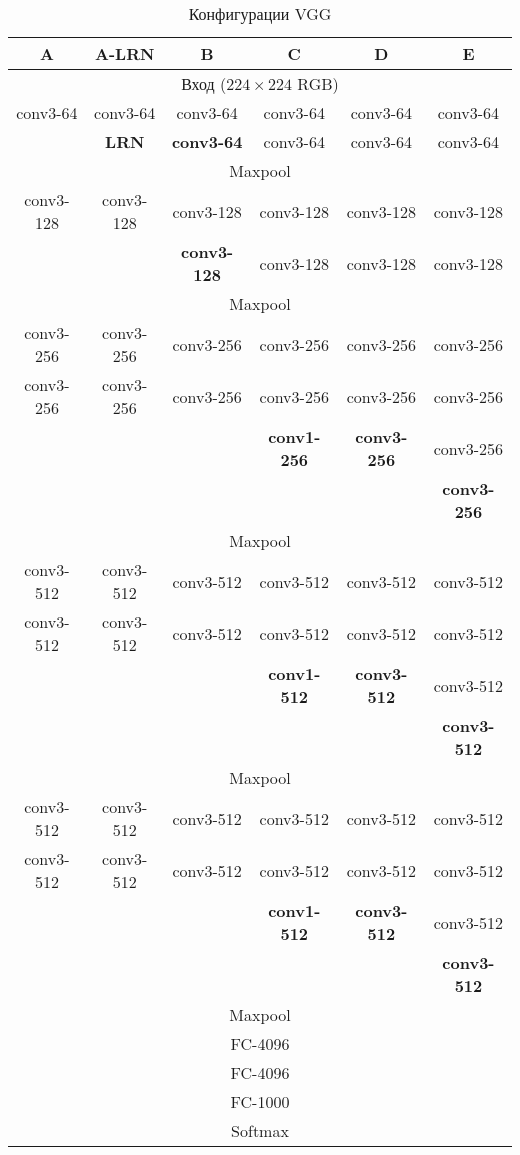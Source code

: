\begin{table}[H]
    \centering
    \caption{Конфигурации VGG} \label{vgg}
    \begin{tabular}{|c|c|c|c|c|c|} \hline
    A & A-LRN & B & C & D & E \\ \hline
    \multicolumn{6}{|c|}{Вход ($224 \times 224$ RGB)} \\ \hline
    conv3-64 & conv3-64 & conv3-64 & conv3-64 & conv3-64 & conv3-64 \\ 
     & \textbf{LRN} & \textbf{conv3-64} & conv3-64 & conv3-64 & conv3-64\\ \hline
    \multicolumn{6}{|c|}{Maxpool} \\ \hline
    conv3-128 & conv3-128 & conv3-128 & conv3-128 & conv3-128 & conv3-128 \\ 
     & & \textbf{conv3-128} & conv3-128 & conv3-128 & conv3-128 \\ \hline
    \multicolumn{6}{|c|}{Maxpool} \\ \hline
    conv3-256 & conv3-256 & conv3-256 & conv3-256 & conv3-256 & conv3-256 \\ 
    conv3-256 & conv3-256 & conv3-256 & conv3-256 & conv3-256 & conv3-256 \\ 
    & & & \textbf{conv1-256} & \textbf{conv3-256} & conv3-256 \\ 
    & & & & & \textbf{conv3-256} \\ \hline
    \multicolumn{6}{|c|}{Maxpool} \\ \hline
    conv3-512 & conv3-512 & conv3-512 & conv3-512 & conv3-512 & conv3-512 \\ 
    conv3-512 & conv3-512 & conv3-512 & conv3-512 & conv3-512 & conv3-512 \\ 
    & & & \textbf{conv1-512} & \textbf{conv3-512} & conv3-512 \\ 
    & & & & & \textbf{conv3-512} \\ \hline
    \multicolumn{6}{|c|}{Maxpool} \\ \hline
    conv3-512 & conv3-512 & conv3-512 & conv3-512 & conv3-512 & conv3-512 \\ 
    conv3-512 & conv3-512 & conv3-512 & conv3-512 & conv3-512 & conv3-512 \\ 
    & & & \textbf{conv1-512} & \textbf{conv3-512} & conv3-512 \\ 
    & & & & & \textbf{conv3-512} \\ \hline
    \multicolumn{6}{|c|}{Maxpool} \\ \hline
    \multicolumn{6}{|c|}{FC-4096} \\ \hline
    \multicolumn{6}{|c|}{FC-4096} \\ \hline
    \multicolumn{6}{|c|}{FC-1000} \\ \hline
    \multicolumn{6}{|c|}{Softmax} \\ \hline
    \end{tabular}
\end{table}